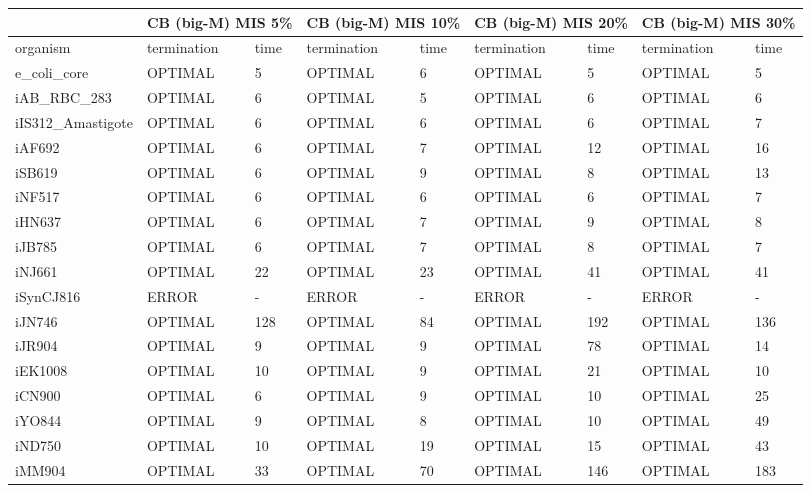 \begin{table}[!ht]
    \small
    \centering
    \begin{tabular}{|l|l|l|l|l|l|l|l|l|}
    \hline
        \multicolumn{1}{|c}{} & \multicolumn{2}{|c|}{CB (big-M) MIS 5\%} & \multicolumn{2}{|c|}{CB (big-M) MIS 10\%} & \multicolumn{2}{|c|}{CB (big-M) MIS 20\%} & \multicolumn{2}{|c|}{CB (big-M) MIS 30\%} \\ \hline
        organism & termination & time & termination & time & termination & time & termination & time \\ \hline
        e\_coli\_core & OPTIMAL & 5 & OPTIMAL & 6 & OPTIMAL & 5 & OPTIMAL & 5 \\ \hline
        iAB\_RBC\_283 & OPTIMAL & 6 & OPTIMAL & 5 & OPTIMAL & 6 & OPTIMAL & 6 \\ \hline
        iIS312\_Amastigote & OPTIMAL & 6 & OPTIMAL & 6 & OPTIMAL & 6 & OPTIMAL & 7 \\ \hline
        iAF692 & OPTIMAL & 6 & OPTIMAL & 7 & OPTIMAL & 12 & OPTIMAL & 16 \\ \hline
        iSB619 & OPTIMAL & 6 & OPTIMAL & 9 & OPTIMAL & 8 & OPTIMAL & 13 \\ \hline
        iNF517 & OPTIMAL & 6 & OPTIMAL & 6 & OPTIMAL & 6 & OPTIMAL & 7 \\ \hline
        iHN637 & OPTIMAL & 6 & OPTIMAL & 7 & OPTIMAL & 9 & OPTIMAL & 8 \\ \hline
        iJB785 & OPTIMAL & 6 & OPTIMAL & 7 & OPTIMAL & 8 & OPTIMAL & 7 \\ \hline
        iNJ661 & OPTIMAL & 22 & OPTIMAL & 23 & OPTIMAL & 41 & OPTIMAL & 41 \\ \hline
        iSynCJ816 & ERROR & - & ERROR & - & ERROR & - & ERROR & - \\ \hline
        iJN746 & OPTIMAL & 128 & OPTIMAL & 84 & OPTIMAL & 192 & OPTIMAL & 136 \\ \hline
        iJR904 & OPTIMAL & 9 & OPTIMAL & 9 & OPTIMAL & 78 & OPTIMAL & 14 \\ \hline
        iEK1008 & OPTIMAL & 10 & OPTIMAL & 9 & OPTIMAL & 21 & OPTIMAL & 10 \\ \hline
        iCN900 & OPTIMAL & 6 & OPTIMAL & 9 & OPTIMAL & 10 & OPTIMAL & 25 \\ \hline
        iYO844 & OPTIMAL & 9 & OPTIMAL & 8 & OPTIMAL & 10 & OPTIMAL & 49 \\ \hline
        iND750 & OPTIMAL & 10 & OPTIMAL & 19 & OPTIMAL & 15 & OPTIMAL & 43 \\ \hline
        iMM904 & OPTIMAL & 33 & OPTIMAL & 70 & OPTIMAL & 146 & OPTIMAL & 183 \\ \hline

\end{tabular}
\end{table}
